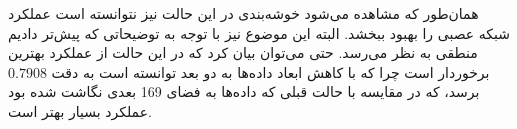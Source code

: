 \documentclass[12pt, a4paper]{article}
\begin{document}
\newpage

همان‌طور که مشاهده می‌شود خوشه‌بندی  در این حالت نیز نتوانسته است عملکرد شبکه عصبی را بهبود ببخشد.
البته این موضوع نیز با توجه به توضیحاتی که پیش‌تر دادیم منطقی به نظر می‌رسد. حتی می‌توان بیان کرد که  در این حالت
از عملکرد بهترین برخوردار است چرا که با کاهش ابعاد داده‌ها به دو بعد توانسته‌ است به دقت $0.7908$ برسد،
که در مقایسه با حالت قبلی که داده‌ها به فضای 169 بعدی نگاشت شده بود عملکرد بسیار بهتر است.
\end{document}
